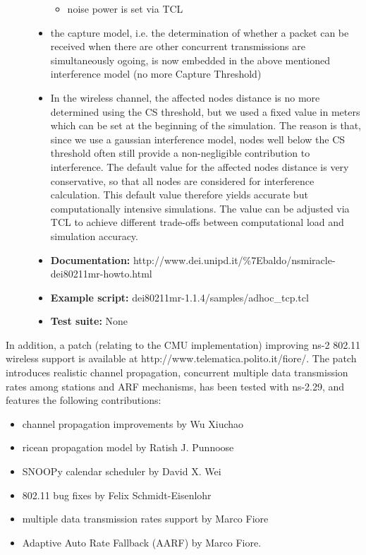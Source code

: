\begin{description}
\begin{itemize}
\begin{itemize}
          \item noise power is set via TCL
\end{itemize}
    \item the capture model, i.e. the determination of whether a packet can be received when there are other concurrent transmissions are simultaneously ogoing, is now embedded in the above mentioned interference model (no more Capture Threshold)
    \item In the wireless channel, the affected nodes distance is no more determined using the CS threshold, but we used a fixed value in meters 
which can be set at the beginning of the simulation. The reason is that, since we use a gaussian interference model, nodes well below the CS threshold often still provide a non-negligible contribution to interference. The default value for the affected nodes distance 
is very conservative, so that all nodes are considered for interference calculation. This default value therefore yields accurate but computationally intensive simulations. The value can be adjusted via TCL to achieve different trade-offs between computational load and simulation accuracy.
\end{itemize}
\begin{itemize}
\item {\bf Documentation:} 
http://www.dei.unipd.it/\%7Ebaldo/nsmiracle-dei80211mr-howto.html
\item {\bf Example script:} dei80211mr-1.1.4/samples/adhoc\_tcp.tcl
\item {\bf Test suite:} None
\end{itemize}
\end{description}
  
In addition, a  patch (relating to the CMU implementation) improving ns-2 
802.11 wireless support is available at http://www.telematica.polito.it/fiore/.
The patch introduces realistic channel propagation, concurrent multiple 
data transmission rates among stations and ARF mechanisms, has been 
tested with ns-2.29, and features the following contributions:
\begin{itemize}
\item channel propagation improvements by Wu Xiuchao
\item ricean propagation model by Ratish J. Punnoose
\item SNOOPy calendar scheduler by David X. Wei
\item 802.11 bug fixes by Felix Schmidt-Eisenlohr
\item multiple data transmission rates support by Marco Fiore
\item Adaptive Auto Rate Fallback (AARF) by Marco Fiore. 
\end{itemize}


